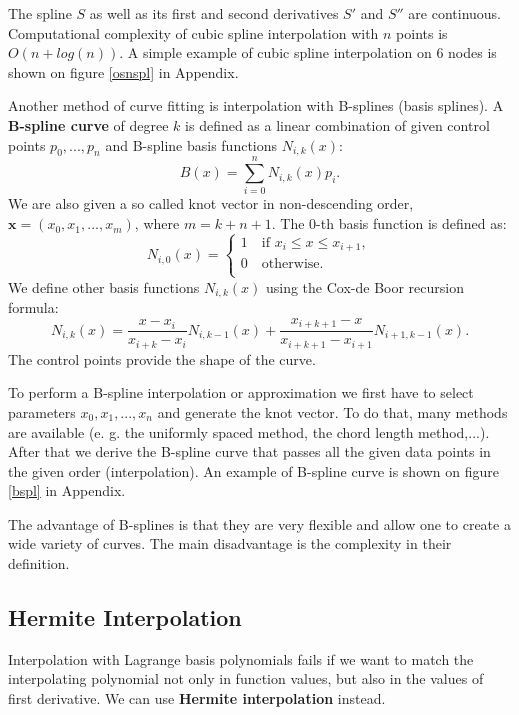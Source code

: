 \documentclass[a4paper,10pt]{article}
\begin{document}
The spline $S$ as well as its first and second derivatives $S'$ and $S''$ are continuous. Computational complexity of cubic spline interpolation with $n$ points is $O(n+log(n))$. \cite{Liao}
A simple example of cubic spline interpolation on 6 nodes is shown on figure \ref{osnspl} in Appendix.

Another method of curve fitting is interpolation with B-splines (basis splines).
A \textbf{B-spline curve} of degree $k$ is defined as a linear combination of given control points $p_0,...,p_n$ and B-spline basis functions $N_{i,k}(x)$: $$B(x)=\sum_{i=0}^{n}N_{i,k}(x)p_i.$$ We are also given a so called knot vector in non-descending order, $\textbf{x}=(x_0, x_1,...,x_m)$, where $m=k+n+1$.
The 0-th basis function is defined as: $$N_{i,0}(x)= 
    \left\{
                \begin{array}{ll}
                  1 \quad \text{if } x_i \leq x \leq x_{i+1},\\
                 0 \quad \text{otherwise.}\\
                  \end{array}
              \right.
  $$
We define other basis functions $N_{i,k}(x)$ using the Cox-de Boor recursion formula: $$N_{i,k}(x)=\frac{x-x_i}{x_{i+k}-x_i}N_{i,k-1}(x)+\frac{x_{i+k+1}-x}{x_{i+k+1}-x_{i+1}}N_{i+1,k-1}(x).$$ The control points provide the shape of the curve. \cite{bspl}

To perform a B-spline interpolation or approximation we first have to select parameters $x_0, x_1,...,x_n$ and generate the knot vector. To do that, many methods are available (e. g. the uniformly spaced method, the chord length method,...). After that we derive the B-spline curve that passes all the given data points in the given order (interpolation). An example of B-spline curve is shown on figure \ref{bspl} in Appendix.

The advantage of B-splines is that they
are very flexible and allow one to create a wide variety of curves. The main disadvantage is the complexity in their definition. \cite{bspl}

\subsection{Hermite Interpolation}
Interpolation with Lagrange basis polynomials fails if we want to match the interpolating polynomial not only in function values, but also in the values of first derivative. We can use \textbf{Hermite interpolation} instead.
\end{document}

